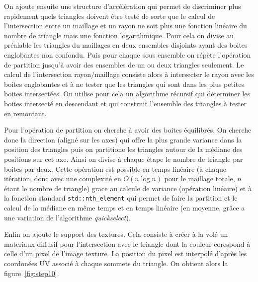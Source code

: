 \documentclass[12pt]{article}
\newcommand\id[1]{\texttt{#1}}
\begin{document}
On ajoute ensuite une structure d'accélération qui permet de discriminer plus rapidement quels triangles doivent être testé de sorte que le calcul de l'intersection entre un maillage et un rayon ne soit plus une fonction linéaire du nombre de triangle mais une fonction logarithmique.
Pour cela on divise au préalable les triangles du maillages en deux ensembles disjoints ayant des boites englobantes non confondu.
Puis pour chaque sous ensemble on répète l'opération de partition jusqu'à avoir des ensembles de un ou deux triangles seulement.
Le calcul de l'intersection rayon/maillage consiste alors à intersecter le rayon avec les boites englobantes et à ne tester que les triangles qui sont dans les plus petites boites intersectées.
On utilise pour cela un algorithme récursif qui déterminer les boites intersecté en descendant et qui construit l'ensemble des triangles à tester en remontant.

Pour l'opération de partition on cherche à avoir des boites équilibrés.
On cherche donc la direction (aligné sur les axes) qui offre la plus grande variance dans la position des triangles puis on partitione les triangles autour de la médiane des positions sur cet axe.
Ainsi on divise à chaque étape le nombre de triangle par boites par deux.
Cette opération est possible en temps linéaire (à chaque itération, donc avec une complexité en $O(n \log{n})$ pour le maillage totale, $n$ étant le nombre de triangle) grace au calcule de variance (opération linéaire) et à la fonction standard \id{std::nth\_element} qui permet de faire la partition et le calcul de la médiane en même temps et en temps linéaire (en moyenne, grâce a une variation de l'algorithme \textit{quickselect}).

Enfin on ajoute le support des textures.
Cela consiste à créer à la volé un materiaux diffusif pour l'intersection avec le triangle dont la couleur corespond à celle d'un pixel de l'image texture.
La position du pixel est interpolé d'après les coordonées UV associé à chaque sommets du triangle.
On obtient alors la figure~\ref{fig:step10}.
\end{document}
